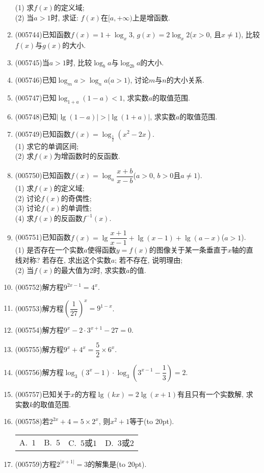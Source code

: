 \documentclass[10pt,a4paper]{article}
\newcommand{\bracket}[1]{(\hbox to #1pt{})}
\newcommand{\fourch}[4]{\par\begin{tabular}{p{.23\textwidth}p{.23\textwidth}p{.23\textwidth}p{.23\textwidth}}
A.~#1 &B.~#2& C.~#3& D.~#4
\end{tabular}}
\begin{document}
\begin{enumerate}[1.]
(1) 求$f(x)$的定义域;\\
(2) 当$a>1$时, 求证: $f(x)$在$[a,+\infty)$上是增函数.
\item {\tiny (005744)}已知函数$f(x)=1+\log_x3$, $g(x)=2\log_x2$($x>0$, 且$x\ne 1$), 比较$f(x)$与$g(x)$的大小.
\item {\tiny (005745)}当$a>1$时, 比较$\log_ba$与$\log_{2b}a$的大小.
\item {\tiny (005746)}已知$\log_ma>\log_na$($a>1$), 讨论$m$与$n$的大小关系.
\item {\tiny (005747)}已知$\log_{1+a}(1-a)<1$, 求实数$a$的取值范围.
\item {\tiny (005748)}已知$|\lg (1-a)|>|\lg (1+a)|$, 求实数$a$的取值范围.
\item {\tiny (005749)}已知函数$f(x)=\log_{\frac 12}(x^2-2x)$.\\
(1) 求它的单调区间;\\
(2) 求$f(x)$为增函数时的反函数.
\item {\tiny (005750)}已知函数$f(x)=\log_a\dfrac{x+b}{x-b}$($a>0$, $b>0$且$a\ne 1$).\\
(1) 求$f(x)$的定义域;\\
(2) 讨论$f(x)$的奇偶性;\\
(3) 讨论$f(x)$的单调性;\\
(4) 求$f(x)$的反函数$f^{-1}(x)$.
\item {\tiny (005751)}已知函数$f(x)=\lg \dfrac{x+1}{x-1}+\lg (x-1)+\lg (a-x)$($a>1$).\\
(1) 是否存在一个实数$a$使得函数$y=f(x)$的图像关于某一条垂直于$x$轴的直线对称? 若存在, 求出这个实数$a$; 若不存在, 说明理由;\\
(2) 当$f(x)$的最大值为2时, 求实数$a$的值.
\item {\tiny (005752)}解方程$9^{2x-1}=4^x$.
\item {\tiny (005753)}解方程$(\dfrac 1{27})^x=9^{1-x}$.
\item {\tiny (005754)}解方程$9^x-2\cdot 3^{x+1}-27=0$.
\item {\tiny (005755)}解方程$9^x+4^x=\dfrac 52\times 6^x$.
\item {\tiny (005756)}解方程$\log_3(3^x-1)\cdot \log_3(3^{x-1}-\dfrac 13)=2$.
\item {\tiny (005757)}已知关于$x$的方程$\lg (kx)=2\lg (x+1)$有且只有一个实数解, 求实数$k$的取值范围.
\item {\tiny (005758)}若$2^{2x}+4=5\times 2^x$, 则$x^2+1$等于\bracket{20}.
\fourch{$1$}{$5$}{$5$或$1$}{$3$或$2$}
\item {\tiny (005759)}方程$2^{|x+1|}=3$的解集是\bracket{20}.

\end{enumerate}
\end{document}
